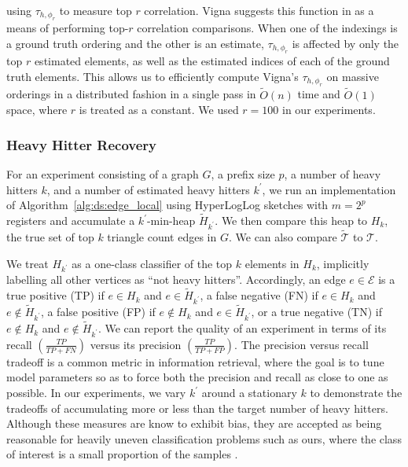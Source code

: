\documentclass[10]{article}
\begin{document}
%
using $\tau_{h,\phi_r}$ to measure top $r$ correlation.
Vigna suggests this function in \cite{vigna2015weighted} as a means of performing top-$r$ correlation comparisons.
When one of the indexings is a ground truth ordering and the other is an estimate, $\tau_{h, \phi_r}$ is affected by only the top $r$ estimated elements, as well as the estimated indices of each of the ground truth elements.
This allows us to efficiently compute Vigna's $\tau_{h, \phi_r}$ on massive orderings in a distributed fashion in a single pass in $\widetilde{O}(n)$ time and $\widetilde{O}(1)$ space, where $r$ is treated as a constant.
We used $r = 100$ in our experiments.

\subsubsection{Heavy Hitter Recovery}

For an experiment consisting of a graph $G$, a prefix size $p$, a number of heavy hitters $k$, and a number of estimated heavy hitters $k^\prime$, we run an implementation of Algorithm~\ref{alg:ds:edge_local} using HyperLogLog sketches with $m=2^p$ registers and accumulate a $k^\prime$-min-heap $\widetilde{H}_{k^\prime}$. 
We then compare this heap to $H_k$, the true set of top $k$ triangle count edges in $G$.
We can also compare $\widetilde{\mathcal{T}}$ to $\mathcal{T}$.

We treat $H_{k^\prime}$ as a one-class classifier of the top $k$ elements in $H_k$, implicitly labelling all other vertices as ``not heavy hitters''.
Accordingly, an edge $e \in \mathcal{E}$ is a true positive (TP) if $e \in H_{k}$ and $e \in \widetilde{H}_{k^\prime}$, a false negative (FN) if $e \in H_{k}$ and $e \not\in \widetilde{H}_{k^\prime}$, a false positive (FP) if $e \not\in H_{k}$ and $e \in \widetilde{H}_{k^\prime}$, or a true negative (TN) if $e \not\in H_{k}$ and $e \not\in \widetilde{H}_{k^\prime}$.
We can report the quality of an experiment in terms of its recall $\left ( \frac{TP}{TP + FN} \right )$ versus its precision $\left ( \frac{TP}{TP + FP} \right )$.
The precision versus recall tradeoff is a common metric in information retrieval, where the goal is to tune model parameters so as to force both the precision and recall as close to one as possible.
In our experiments, we vary $k^\prime$ around a stationary $k$ to demonstrate the tradeoffs of accumulating more or less than the target number of heavy hitters.
Although these measures are know to exhibit bias, they are accepted as being reasonable for heavily uneven classification problems such as ours, where the class of interest is a small proportion of the samples \cite{boughorbel2017optimal}. 
\end{document}
